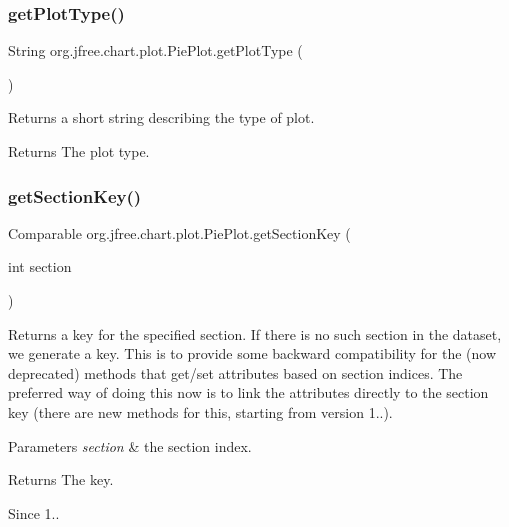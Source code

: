\subsubsection{\texorpdfstring{get\+Plot\+Type()}{getPlotType()}}
{\footnotesize\ttfamily String org.\+jfree.\+chart.\+plot.\+Pie\+Plot.\+get\+Plot\+Type (\begin{DoxyParamCaption}{ }\end{DoxyParamCaption})}

Returns a short string describing the type of plot.

\begin{DoxyReturn}{Returns}
The plot type. 
\end{DoxyReturn}
\mbox{\label{classorg_1_1jfree_1_1chart_1_1plot_1_1_pie_plot_abd2f7b99ea65df676dcf19bcec2d7979}} 
\subsubsection{\texorpdfstring{get\+Section\+Key()}{getSectionKey()}}
{\footnotesize\ttfamily Comparable org.\+jfree.\+chart.\+plot.\+Pie\+Plot.\+get\+Section\+Key (\begin{DoxyParamCaption}\item[{int}]{section }\end{DoxyParamCaption})\hspace{0.3cm}{\ttfamily [protected]}}

Returns a key for the specified section. If there is no such section in the dataset, we generate a key. This is to provide some backward compatibility for the (now deprecated) methods that get/set attributes based on section indices. The preferred way of doing this now is to link the attributes directly to the section key (there are new methods for this, starting from version 1..).


\begin{DoxyParams}{Parameters}
{\em section} & the section index.\\
\hline
\end{DoxyParams}
\begin{DoxyReturn}{Returns}
The key.
\end{DoxyReturn}
\begin{DoxySince}{Since}
1.. 
\end{DoxySince}
\mbox{\label{classorg_1_1jfree_1_1chart_1_1plot_1_1_pie_plot_ad5075d6d33c6dfbaab396a2b4a6b45bf}} 
